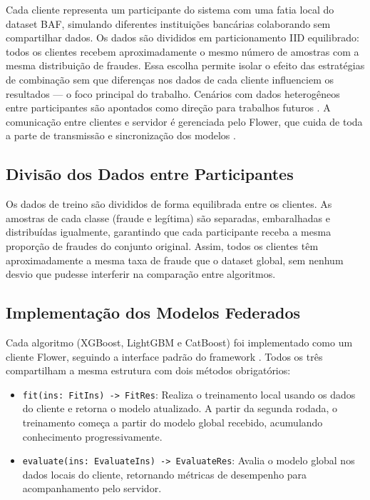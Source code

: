 Cada cliente representa um participante do sistema com uma fatia local do dataset BAF, simulando diferentes instituições bancárias colaborando sem compartilhar dados. Os dados são divididos em particionamento IID equilibrado: todos os clientes recebem aproximadamente o mesmo número de amostras com a mesma distribuição de fraudes. Essa escolha permite isolar o efeito das estratégias de combinação sem que diferenças nos dados de cada cliente influenciem os resultados --- o foco principal do trabalho. Cenários com dados heterogêneos entre participantes são apontados como direção para trabalhos futuros \cite{zhu2021noniid, li2020fedprox}. A comunicação entre clientes e servidor é gerenciada pelo Flower, que cuida de toda a parte de transmissão e sincronização dos modelos \cite{flower2020}.

\subsection{Divisão dos Dados entre Participantes}

Os dados de treino são divididos de forma equilibrada entre os clientes. As amostras de cada classe (fraude e legítima) são separadas, embaralhadas e distribuídas igualmente, garantindo que cada participante receba a mesma proporção de fraudes do conjunto original. Assim, todos os clientes têm aproximadamente a mesma taxa de fraude que o dataset global, sem nenhum desvio que pudesse interferir na comparação entre algoritmos.

\subsection{Implementação dos Modelos Federados}

Cada algoritmo (XGBoost, LightGBM e CatBoost) foi implementado como um cliente Flower, seguindo a interface padrão do framework \cite{flower2020}. Todos os três compartilham a mesma estrutura com dois métodos obrigatórios:

\begin{itemize}
    \item \texttt{fit(ins: FitIns) -> FitRes}: Realiza o treinamento local usando os dados do cliente e retorna o modelo atualizado. A partir da segunda rodada, o treinamento começa a partir do modelo global recebido, acumulando conhecimento progressivamente.

    \item \texttt{evaluate(ins: EvaluateIns) -> EvaluateRes}: Avalia o modelo global nos dados locais do cliente, retornando métricas de desempenho para acompanhamento pelo servidor.
\end{itemize}

